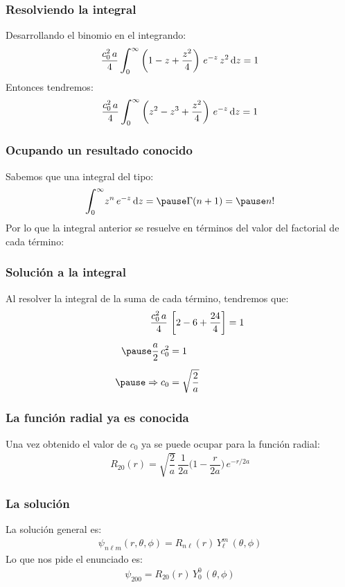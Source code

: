 \documentclass[12pt]{beamer}
\begin{document}
\begin{frame}
\frametitle{Resolviendo la integral}
Desarrollando el binomio en el integrando:
\pause
\begin{align*}
\dfrac{c_{0}^{2} \, a}{4} \, \scaleint{6ex}_{\bs 0}^{\infty} \left( 1 - z + \dfrac{z^{2}}{4} \right) \, e^{-z} \, z^{2} \dd{z} = 1
\end{align*}
\pause
Entonces tendremos:
\begin{align*}
\dfrac{c_{0}^{2} \, a}{4} \, \scaleint{6ex}_{\bs 0}^{\infty} \left( z^{2} - z^{3} + \dfrac{z^{2}}{4} \right) \, e^{-z} \dd{z} = 1
\end{align*}
\end{frame}
\begin{frame}
\frametitle{Ocupando un resultado conocido}
Sabemos que una integral del tipo:
\begin{eqnarray*}
\scaleint{6ex}_{\bs 0}^{\infty} z^{n} \, e^{-z} \dd{z} = \pause \Gamma(n + 1) = \pause n!
\end{eqnarray*}
\pause
Por lo que la integral anterior se resuelve en términos del valor del factorial de cada término:
\end{frame}
\begin{frame}
\frametitle{Solución a la integral}
Al resolver la integral de la suma de cada término, tendremos que:
\pause
\begin{equation*}
\begin{aligned}
\dfrac{c_{0}^{2} \, a}{4} \, &\left[ 2 - 6 + \dfrac{24}{4} \right] = 1 \\[0.5em] \pause
\dfrac{a}{2} \, c_{0}^{2} &= 1 \\[0.5em] \pause
\Rightarrow c_{0} &= \sqrt{\dfrac{2}{a}}
\end{aligned}
\end{equation*}
\end{frame}
\begin{frame}
\frametitle{La función radial ya es conocida}
Una vez obtenido el valor de $c_{0}$ ya se puede ocupar para la función radial:
\pause
\begin{align*}
R_{20} (r) = \sqrt{\dfrac{2}{a}} \, \dfrac{1}{2 a} \bigg( 1 - \dfrac{r}{2 a} \bigg) \, e^{-r/2a}
\end{align*}
\end{frame}
\begin{frame}
\frametitle{La solución}
La solución general es:
\begin{align*}
\psi_{n \ell m} (r, \theta, \phi) = R_{n \ell} (r) \, Y_{\ell}^{m} \, (\theta, \phi)
\end{align*}
\pause
Lo que nos pide el enunciado es:
\begin{align*}
\psi_{200} = R_{2 0} (r) \, Y_{0}^{0} \, (\theta, \phi)
\end{align*}
\end{frame}
\end{document}
